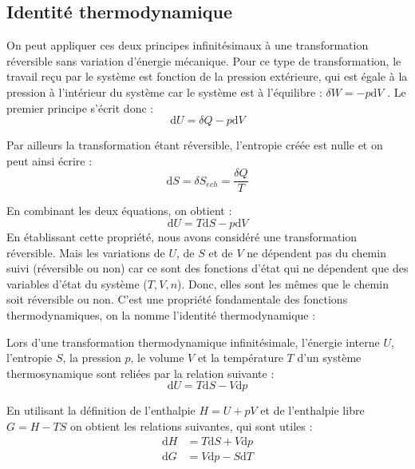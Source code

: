 \documentclass[11pt,fleqn]{book} %
\newcommand{\dd}{\mathrm{d}}
\begin{document}
\subsection{Identité thermodynamique}

On peut appliquer ces deux principes infinitésimaux à une transformation réversible sans variation d'énergie mécanique. Pour ce type de transformation, le travail reçu par le système est fonction de la pression extérieure, qui est égale à la pression à l'intérieur du système car le système est à l'équilibre : $\delta W = - p \dd V$ . Le premier principe s'écrit donc :
\begin{equation}
    \dd U = \delta Q - p \dd V
\end{equation}

Par ailleurs la transformation étant réversible, l'entropie créée est nulle et on peut ainsi écrire :
\begin{equation}
    \dd S  = \delta S_{ech} = \frac{\delta Q}{T}
\end{equation}

En combinant les deux équations, on obtient :
\begin{equation}
    \dd U = T \dd S - p \dd V
\end{equation}
En établissant cette propriété, nous avons considéré une transformation réversible. Mais les variations de $U$, de $S$ et de $V$ ne dépendent pas du chemin suivi (réversible ou non) car ce sont des fonctions d'état qui ne dépendent que des variables d'état du système ($T,V,n$). Donc, elles sont les mêmes que le chemin soit réversible ou non. C'est une propriété fondamentale des fonctions thermodynamiques, on la nomme l'identité thermodynamique :

\begin{theorem}
    Lors d'une transformation thermodynamique infinitésimale, l'énergie interne $U$, l'entropie $S$, la pression $p$, le volume $V$ et la température $T$ d'un système thermosynamique sont reliées par la relation suivante :
    \begin{equation}
        \dd U = T \dd S - V \dd p
    \end{equation}
\end{theorem}

En utilisant la définition de l'enthalpie $H = U + pV$ et de l'enthalpie libre $G = H - TS$ on obtient les relations suivantes, qui sont utiles :
\begin{align}
    \dd H &= T \dd S + V \dd p\\
    \dd G &= V \dd p - S \dd T
\end{align}
\end{document}
